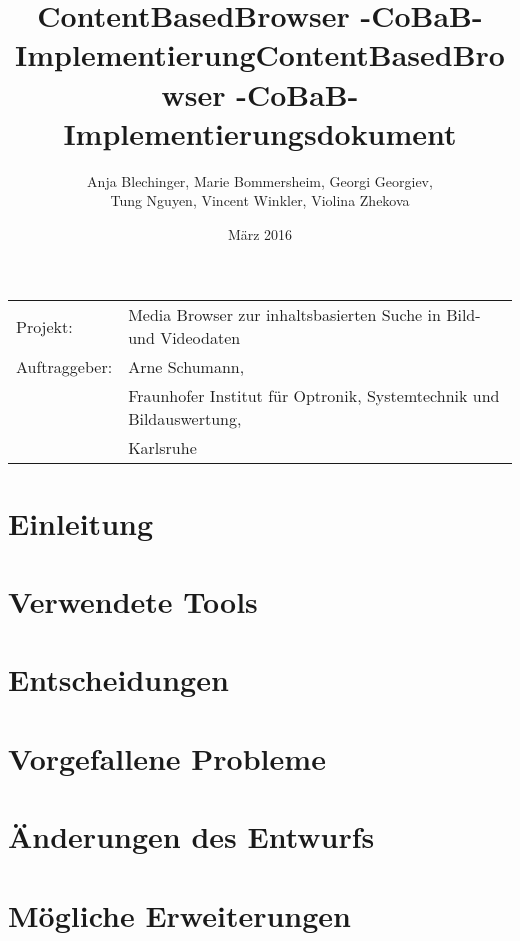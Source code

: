 \documentclass[parskip=full]{scrartcl}
\title{ContentBasedBrowser -CoBaB- \\ Implementierung}
\begin{document}
\begin{titlepage}
\title{ContentBasedBrowser -CoBaB- \\ Implementierungsdokument}
\author{Anja Blechinger, Marie Bommersheim, Georgi Georgiev,\\ Tung Nguyen, Vincent Winkler, Violina Zhekova}
\date{März 2016}
\maketitle
\vspace{300pt}
\begin{tabular}{l l}
Projekt: & Media Browser zur inhaltsbasierten Suche in Bild- und Videodaten\\
Auftraggeber: & Arne Schumann,\\
 & Fraunhofer Institut für Optronik, Systemtechnik und Bildauswertung,\\
 & Karlsruhe\\
\end{tabular}
\thispagestyle{empty}
\end{titlepage}
\setcounter{page}{1}

\tableofcontents
\pagebreak

\section{Einleitung}

\pagebreak

\section{Verwendete Tools}

\pagebreak

\section{Entscheidungen}

\pagebreak

\section{Vorgefallene Probleme}

\pagebreak

\section{Änderungen des Entwurfs}

\pagebreak

\section{Mögliche Erweiterungen}

\pagebreak
\end{document}
